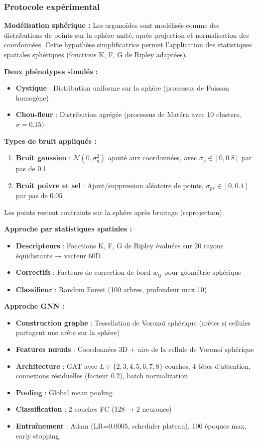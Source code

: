 \subsubsection{Protocole expérimental}

\textbf{Modélisation sphérique :}
Les organoïdes sont modélisés comme des distributions de points sur la sphère unité, après projection et normalisation des coordonnées. Cette hypothèse simplificatrice permet l'application des statistiques spatiales sphériques (fonctions K, F, G de Ripley adaptées).

\textbf{Deux phénotypes simulés :}
\begin{itemize}
    \item \textbf{Cystique} : Distribution uniforme sur la sphère (processus de Poisson homogène)
    \item \textbf{Chou-fleur} : Distribution agrégée (processus de Matérn avec 10 clusters, $\sigma = 0.15$)
\end{itemize}

\textbf{Types de bruit appliqués :}
\begin{enumerate}
    \item \textbf{Bruit gaussien} : $\mathcal{N}(0, \sigma_g^2)$ ajouté aux coordonnées, avec $\sigma_g \in [0, 0.8]$ par pas de 0.1
    \item \textbf{Bruit poivre et sel} : Ajout/suppression aléatoire de points, $\sigma_{ps} \in [0, 0.4]$ par pas de 0.05
\end{enumerate}

Les points restent contraints sur la sphère après bruitage (reprojection).

\textbf{Approche par statistiques spatiales :}
\begin{itemize}
    \item \textbf{Descripteurs} : Fonctions K, F, G de Ripley évaluées sur 20 rayons équidistants → vecteur 60D
    \item \textbf{Correctifs} : Facteurs de correction de bord $w_{ij}$ pour géométrie sphérique
    \item \textbf{Classifieur} : Random Forest (100 arbres, profondeur max 10)
\end{itemize}

\textbf{Approche GNN :}
\begin{itemize}
    \item \textbf{Construction graphe} : Tessellation de Voronoï sphérique (arêtes si cellules partagent une arête sur la sphère)
    \item \textbf{Features nœuds} : Coordonnées 3D + aire de la cellule de Voronoï sphérique
    \item \textbf{Architecture} : GAT avec $L \in \{2, 3, 4, 5, 6, 7, 8\}$ couches, 4 têtes d'attention, connexions résiduelles (facteur 0.2), batch normalization
    \item \textbf{Pooling} : Global mean pooling
    \item \textbf{Classification} : 2 couches FC (128 → 2 neurones)
    \item \textbf{Entraînement} : Adam (LR=0.0005, scheduler plateau), 100 époques max, early stopping
\end{itemize}

